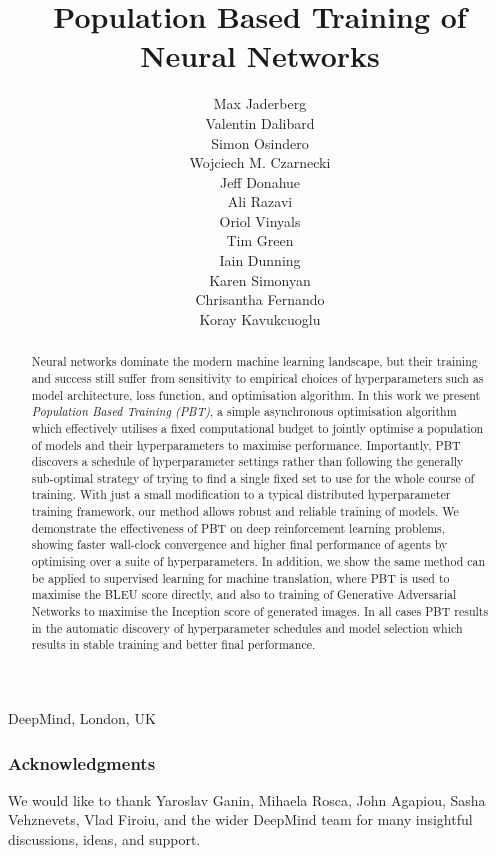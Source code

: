 \documentclass{article} %
\title{Population Based Training of Neural Networks}
\author{
Max Jaderberg \\
\And
Valentin Dalibard \\
\And
Simon Osindero \\
\And
Wojciech M. Czarnecki \\
\AND
Jeff Donahue \\
\And
Ali Razavi \\
\And
Oriol Vinyals \\
\And
Tim Green \\
\And
Iain Dunning\\
\AND
Karen Simonyan \\
\And
Chrisantha Fernando \\
\And
Koray Kavukcuoglu
}
\begin{document}
\maketitle

\vspace{-3.0em}
 \begin{center}
 DeepMind, London, UK
 \end{center}
 \vspace{1em}



\begin{abstract}


Neural networks dominate the modern machine learning landscape, but their training and success still suffer from sensitivity to empirical choices of hyperparameters such as model architecture, loss function, and optimisation algorithm.
%
In this work we present \emph{Population Based Training (PBT)}, a simple asynchronous optimisation algorithm which effectively utilises a fixed computational budget to jointly optimise a population of models and their hyperparameters to maximise performance.
%
Importantly, PBT discovers a schedule of hyperparameter settings rather than following the generally sub-optimal strategy of trying to find a single fixed set to use for the whole course of training.
%
%
With just a small modification to a typical distributed hyperparameter training framework, our method allows robust and reliable training of models. 
%
We demonstrate the effectiveness of PBT on deep reinforcement learning problems, showing faster wall-clock convergence and higher final performance of agents by optimising over a suite of hyperparameters. 
%
In addition, we show the same method can be applied to supervised learning for machine translation, where PBT is used to maximise the BLEU score directly, and also to training of Generative Adversarial Networks to maximise the Inception score of generated images.
%
In all cases PBT results in the automatic discovery of hyperparameter schedules and model selection which results in stable training and better final performance.


\end{abstract}







\subsubsection*{Acknowledgments}
We would like to thank Yaroslav Ganin, Mihaela Rosca, John Agapiou, Sasha Vehznevets, Vlad Firoiu, and the wider DeepMind team for many insightful discussions, ideas, and support. 






\end{document}
